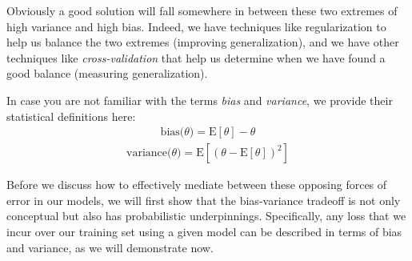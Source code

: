 Obviously a good solution will fall somewhere in between these two extremes of high variance and high bias. Indeed, we have techniques like regularization to help us balance the two extremes (improving generalization), and we have other techniques like \textit{cross-validation} that help us determine when we have found a good balance (measuring generalization).

\begin{warning}
    In case you are not familiar with the terms \textit{bias} and \textit{variance}, we provide their statistical definitions here:
    \begin{align*}
        \text{bias($\theta$)} = \mathrm{E}[\theta] - \theta
    \end{align*}
    \begin{align*}
        \text{variance($\theta$)} = \mathrm{E}[(\theta - \mathrm{E}[\theta])^{2}]
    \end{align*}
\end{warning}

Before we discuss how to effectively mediate between these opposing forces of error in our models, we will first show that the bias-variance tradeoff is not only conceptual but also has probabilistic underpinnings. Specifically, any loss that we incur over our training set using a given model can be described in terms of bias and variance, as we will demonstrate now.


